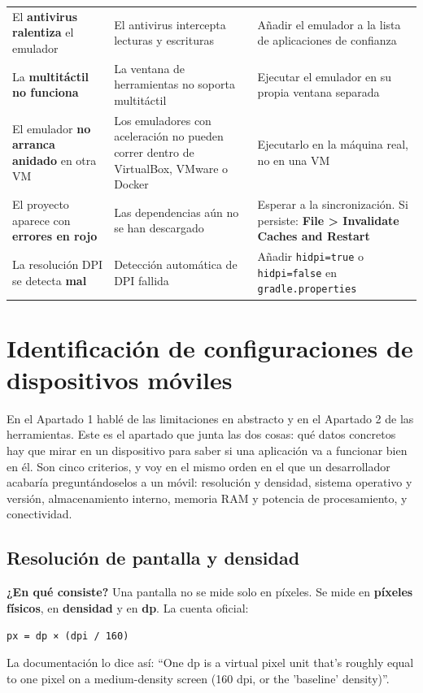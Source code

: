 \documentclass[11pt,a4paper]{article}
\newcommand{\code}[1]{\texttt{\color{navylight}#1}}
\newcommand{\archivo}[1]{\texttt{\color{teal!85!black}#1}}
\newcommand{\campo}[1]{\textbf{\color{navy}#1}}
\begin{document}
\begin{xltabular}{\textwidth}{@{}>{\RaggedRight\arraybackslash}p{3.3cm} >{\RaggedRight\arraybackslash}p{4.5cm} >{\RaggedRight\arraybackslash}X@{}}
		El \textbf{antivirus ralentiza} el emulador & El antivirus intercepta lecturas y escrituras & Añadir el emulador a la lista de aplicaciones de confianza \\
		La \textbf{multitáctil no funciona} & La ventana de herramientas no soporta multitáctil & Ejecutar el emulador en su propia ventana separada \\
		El emulador \textbf{no arranca anidado} en otra VM & Los emuladores con aceleración no pueden correr dentro de VirtualBox, VMware o Docker & Ejecutarlo en la máquina real, no en una VM \\
		El proyecto aparece con \textbf{errores en rojo} & Las dependencias aún no se han descargado & Esperar a la sincronización. Si persiste: \textbf{File > Invalidate Caches and Restart} \\
		La resolución DPI se detecta \textbf{mal} & Detección automática de DPI fallida & Añadir \code{hidpi=true} o \code{hidpi=false} en \archivo{gradle.properties} \\
	\end{xltabular}
	
	\section{Identificación de configuraciones de dispositivos móviles}
	
	En el Apartado 1 hablé de las limitaciones en abstracto y en el Apartado 2 de las herramientas. Este es el apartado que junta las dos cosas: qué datos concretos hay que mirar en un dispositivo para saber si una aplicación va a funcionar bien en él. Son cinco criterios, y voy en el mismo orden en el que un desarrollador acabaría preguntándoselos a un móvil: resolución y densidad, sistema operativo y versión, almacenamiento interno, memoria RAM y potencia de procesamiento, y conectividad.
	
	\subsection{Resolución de pantalla y densidad}
	
	\campo{¿En qué consiste?}
	Una pantalla no se mide solo en píxeles. Se mide en \textbf{píxeles físicos}, en \textbf{densidad} y en \textbf{dp}. La cuenta oficial:
	\begin{center}\code{px = dp × (dpi / 160)}\end{center}
	La documentación lo dice así: \enquote{One dp is a virtual pixel unit that's roughly equal to one pixel on a medium-density screen (160 dpi, or the 'baseline' density)}.
	
\end{document}
